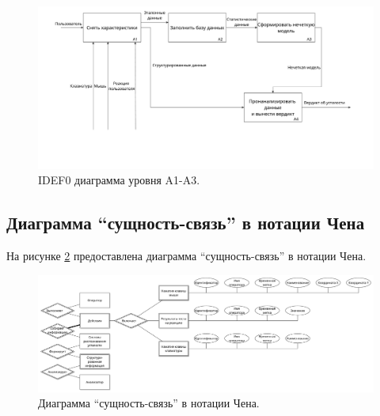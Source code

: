 \begin{figure}[H]
	\centering
	\includegraphics[scale=0.28]{img/A123.pdf}
	\caption{IDEF0 диаграмма уровня A1-A3.}
	\label{fig:idef:1}
\end{figure}

\subsection{Диаграмма ``сущность-связь'' в нотации Чена}
На рисунке \ref{fig:erDiag} предоставлена диаграмма ``сущность-связь'' в нотации Чена.

\begin{figure}[H]
	\centering
	\includegraphics[scale=0.28]{img/chenERDiagram.pdf}
	\caption{Диаграмма ``сущность-связь'' в нотации Чена.}
	\label{fig:erDiag}
\end{figure}

